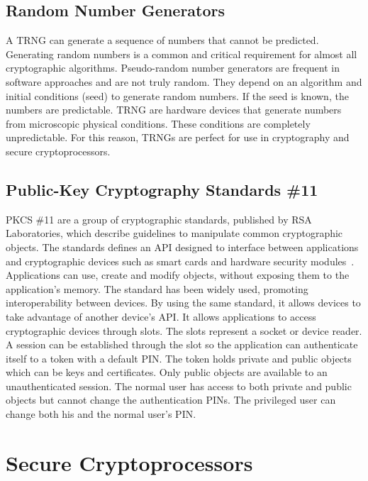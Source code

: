\subsection{Random Number Generators}
A \ac{TRNG} can generate a sequence of numbers that cannot be predicted. Generating random numbers is a common and critical requirement for almost all cryptographic algorithms. Pseudo-random number generators are frequent in software approaches and are not truly random. They depend on an algorithm and initial conditions (seed) to generate random numbers. If the seed is known, the numbers are predictable.
\ac{TRNG} are hardware devices that generate numbers from microscopic physical conditions. These conditions are completely unpredictable. For this reason, \ac{TRNG}s are perfect for use in cryptography and secure cryptoprocessors.

\subsection{Public-Key Cryptography Standards \#11}
\ac{PKCS} \#11 are a group of cryptographic standards, published by RSA Laboratories, which describe guidelines to manipulate common cryptographic objects.
The standards defines an \ac{API} designed to interface between applications and cryptographic devices such as smart cards and hardware security modules~\cite{pkcs11analysis}. 
Applications can use, create and modify objects, without exposing them to the application's memory.
The standard has been widely used, promoting interoperability between devices. By using the same standard, it allows devices to take advantage of another device's \ac{API}.
It allows applications to access cryptographic devices through slots. The slots represent a socket or device reader. A session can be established through the slot so the application can authenticate itself to a token with a default \ac{PIN}. The token holds private and public objects which can be keys and certificates. Only public objects are available to an unauthenticated session. The normal user has access to both private and public objects but cannot change the authentication \ac{PIN}s. The privileged user can change both his and the normal user's \ac{PIN}.
\section{Secure Cryptoprocessors}\label{chap:background:cryptoprocessors}

